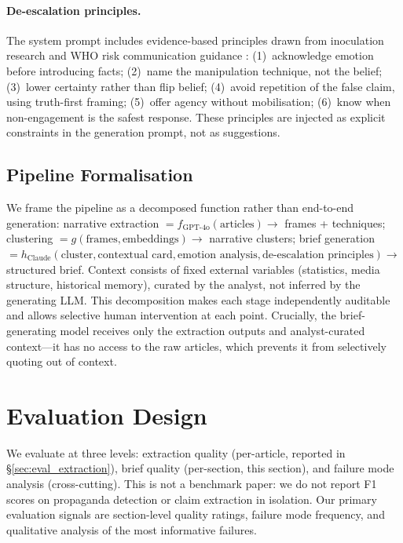 \documentclass[10pt, a4paper]{article}
\begin{document}
\paragraph{De-escalation principles.}
The system prompt includes evidence-based principles drawn from inoculation research \citep{vanderlinden2017inoculating} and WHO risk communication guidance \citep{who_risk_communication}: (1)~acknowledge emotion before introducing facts; (2)~name the manipulation technique, not the belief; (3)~lower certainty rather than flip belief; (4)~avoid repetition of the false claim, using truth-first framing; (5)~offer agency without mobilisation; (6)~know when non-engagement is the safest response. These principles are injected as explicit constraints in the generation prompt, not as suggestions.


\subsection{Pipeline Formalisation}
\label{sec:formalisation}

We frame the pipeline as a decomposed function rather than end-to-end generation: narrative extraction $= f_{\text{GPT-4o}}(\text{articles}) \rightarrow$ frames + techniques; clustering $= g(\text{frames}, \text{embeddings}) \rightarrow$ narrative clusters; brief generation $= h_{\text{Claude}}(\text{cluster}, \text{contextual card}, \text{emotion analysis}, \text{de-escalation principles}) \rightarrow$ structured brief. Context consists of fixed external variables (statistics, media structure, historical memory), curated by the analyst, not inferred by the generating LLM. This decomposition makes each stage independently auditable and allows selective human intervention at each point. Crucially, the brief-generating model receives only the extraction outputs and analyst-curated context---it has no access to the raw articles, which prevents it from selectively quoting out of context.


\section{Evaluation Design}
\label{sec:evaluation}

We evaluate at three levels: extraction quality (per-article, reported in \S\ref{sec:eval_extraction}), brief quality (per-section, this section), and failure mode analysis (cross-cutting). This is not a benchmark paper: we do not report F1 scores on propaganda detection or claim extraction in isolation. Our primary evaluation signals are section-level quality ratings, failure mode frequency, and qualitative analysis of the most informative failures.
\end{document}

